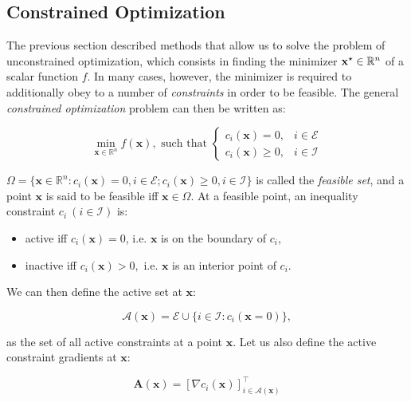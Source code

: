 \subsection{Constrained Optimization}

The previous section described methods that allow us to solve the
problem of unconstrained optimization, which consists in finding the
minimizer $\mathbf{x}^{\star}\in\mathbb R^n$ of a scalar function $f$. In many
cases, however, the minimizer is required to additionally obey to a
number of \emph{constraints} in order to be feasible. The general
\emph{constrained optimization} problem can then be written as:

\begin{equation}
\label{eq:chap3-nlp}
\min_{\mathbf{x} \in \mathbb R^n}
f(\mathbf{x}),\text{ such that }
\left\{\begin{array}{cc}
c_i(\mathbf{x}) = 0, & i \in \mathcal{E} \\%
c_i(\mathbf{x}) \ge 0, & i \in \mathcal{I} %
\end{array}\right.
\end{equation}

$\Omega=\{\mathbf{x}\in\mathbb R^n: c_i(\mathbf{x}) = 0, i \in
\mathcal{E}; c_i(\mathbf{x}) \ge 0, i \in \mathcal{I}\}$ is called the
\emph{feasible set}, and a point $\mathbf{x}$ is said to be feasible
iff $\mathbf{x}\in\Omega$. At a feasible point, an inequality
constraint $c_i~(i\in \mathcal{I})$ is:

\begin{itemize}[noitemsep,nolistsep]
\item active iff $c_i(\mathbf{x})=0$, i.e. $\mathbf{x}$ is on the boundary of $c_i$,
\item inactive iff $c_i(\mathbf{x})>0,$ i.e. $\mathbf{x}$ is an
  interior point of $c_i$.
\end{itemize}
\vspace{\baselineskip}
We can then define the active set at $\mathbf{x}$:

\begin{equation}
\mathcal{A}(\mathbf{x})=\mathcal{E}\cup\{i\in\mathcal{I}:c_i(\mathbf{x}=0)\},
\end{equation}

as the set of all active constraints at a point $\mathbf{x}$. Let us
also define the active constraint gradients at $\mathbf{x}$:

\begin{equation}
\mathbf{A}(\mathbf{x})=\left[\nabla
  c_i(\mathbf{x})\right]_{i\in\mathcal{A}(\mathbf{x})}^\top
\end{equation}

